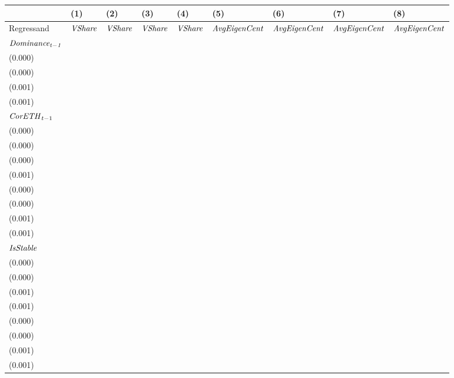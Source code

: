 \begin{tabular}{lllllllll}
\toprule
{} &                                  (1) &                                   (2) &                                  (3) &                                   (4) &                                  (5) &                                   (6) &                                  (7) &                                   (8) \\
\midrule
Regressand                   &                       ${\it VShare}$ &                        ${\it VShare}$ &                       ${\it VShare}$ &                        ${\it VShare}$ &                 ${\it AvgEigenCent}$ &                  ${\it AvgEigenCent}$ &                 ${\it AvgEigenCent}$ &                  ${\it AvgEigenCent}$ \\
$\it Dominance_{t-1}$        &  \makecell{$0.994^{***}$ \\ (0.000)} &   \makecell{$0.994^{***}$ \\ (0.000)} &                          \makecell{} &                           \makecell{} &  \makecell{$0.985^{***}$ \\ (0.001)} &   \makecell{$0.985^{***}$ \\ (0.001)} &                          \makecell{} &                           \makecell{} \\
${{\it CorETH}}_{t-1}$       &  \makecell{$0.000^{***}$ \\ (0.000)} &   \makecell{$0.000^{***}$ \\ (0.000)} &  \makecell{$0.026^{***}$ \\ (0.000)} &   \makecell{$0.030^{***}$ \\ (0.001)} &  \makecell{$0.001^{***}$ \\ (0.000)} &   \makecell{$0.001^{***}$ \\ (0.000)} &  \makecell{$0.046^{***}$ \\ (0.001)} &   \makecell{$0.048^{***}$ \\ (0.001)} \\
${\it IsStable}$             &  \makecell{$0.000^{***}$ \\ (0.000)} &   \makecell{$0.000^{***}$ \\ (0.000)} &  \makecell{$0.049^{***}$ \\ (0.001)} &   \makecell{$0.049^{***}$ \\ (0.001)} &  \makecell{$0.002^{***}$ \\ (0.000)} &   \makecell{$0.002^{***}$ \\ (0.000)} &  \makecell{$0.127^{***}$ \\ (0.001)} &   \makecell{$0.127^{***}$ \\ (0.001)} \\

\end{tabular}
